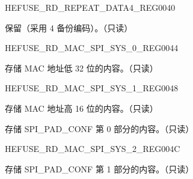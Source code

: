 \begin{register}{H}{EFUSE\_RD\_REPEAT\_DATA4\_REG}{\hexprefix{}0040}\label{regdesc:EFUSERDREPEATDATA4REG}
%
%
\regnewline%
\begin{regdesc}\begin{reglist}
\label{fielddesc:EFUSERPT4RESERVED4}\item [EFUSE\_RPT4\_RESERVED4] 保留（采用 4 备份编码）。（只读）
\end{reglist}\end{regdesc}
\end{register}


\begin{register}{H}{EFUSE\_RD\_MAC\_SPI\_SYS\_0\_REG}{\hexprefix{}0044}\label{regdesc:EFUSERDMACSPISYS0REG}
%
\regnewline%
\begin{regdesc}\begin{reglist}
\label{fielddesc:EFUSEMAC0}\item [EFUSE\_MAC\_0] 存储 MAC 地址低 32 位的内容。（只读）
\end{reglist}\end{regdesc}
\end{register}


\begin{register}{H}{EFUSE\_RD\_MAC\_SPI\_SYS\_1\_REG}{\hexprefix{}0048}\label{regdesc:EFUSERDMACSPISYS1REG}
%
%
\regnewline%
\begin{regdesc}\begin{reglist}
\label{fielddesc:EFUSEMAC1}\item [EFUSE\_MAC\_1] 存储 MAC 地址高 16 位的内容。（只读）
\label{fielddesc:EFUSESPIPADCONF0}\item [EFUSE\_SPI\_PAD\_CONF\_0] 存储 SPI\_PAD\_CONF 第 0 部分的内容。（只读）
\end{reglist}\end{regdesc}
\end{register}


\begin{register}{H}{EFUSE\_RD\_MAC\_SPI\_SYS\_2\_REG}{\hexprefix{}004C}\label{regdesc:EFUSERDMACSPISYS2REG}
%
\regnewline%
\begin{regdesc}\begin{reglist}
\label{fielddesc:EFUSESPIPADCONF1}\item [EFUSE\_SPI\_PAD\_CONF\_1] 存储 SPI\_PAD\_CONF 第 1 部分的内容。（只读）
\end{reglist}\end{regdesc}
\end{register}


